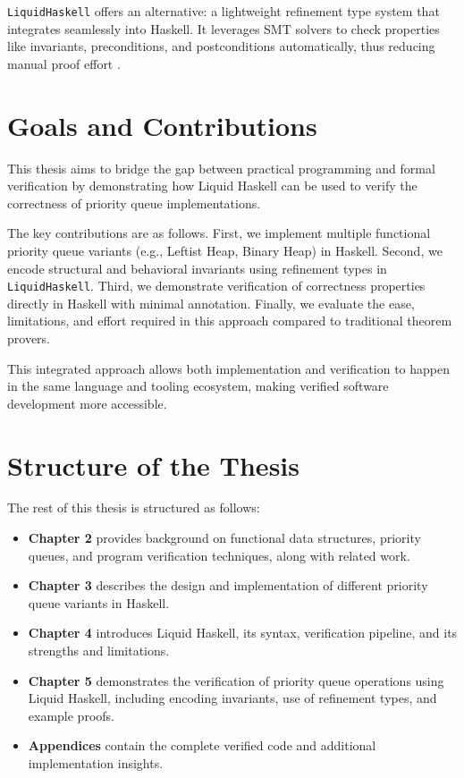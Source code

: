 \texttt{LiquidHaskell} offers an alternative: a lightweight refinement type system that integrates seamlessly into Haskell.
It leverages SMT solvers to check properties like invariants, preconditions, and postconditions automatically, thus reducing manual proof effort \cite{vazou2018}.
\section{ Goals and Contributions }
This thesis aims to bridge the gap between practical programming and formal verification by demonstrating how Liquid Haskell can be used to verify the correctness of priority queue implementations.

The key contributions are as follows.
First, we implement multiple functional priority queue variants (e.g., Leftist Heap, Binary Heap) in Haskell.
Second, we encode structural and behavioral invariants using refinement types in \texttt{LiquidHaskell}.
Third, we demonstrate verification of correctness properties directly in Haskell with minimal annotation.
Finally, we evaluate the ease, limitations, and effort required in this approach compared to traditional theorem provers.

This integrated approach allows both implementation and verification to happen in the same language and tooling ecosystem, making verified software development more accessible.
\section{ Structure of the Thesis }
The rest of this thesis is structured as follows:

\begin{itemize}
	\item \textbf{Chapter 2} provides background on functional data structures, priority queues, and program verification techniques, along with related work.
	\item \textbf{Chapter 3} describes the design and implementation of different priority queue variants in Haskell.
	\item \textbf{Chapter 4} introduces Liquid Haskell, its syntax, verification pipeline, and its strengths and limitations.
	\item \textbf{Chapter 5} demonstrates the verification of priority queue operations using Liquid Haskell, including encoding invariants, use of refinement types, and example proofs.
	\item \textbf{Appendices} contain the complete verified code and additional implementation insights.
\end{itemize}
